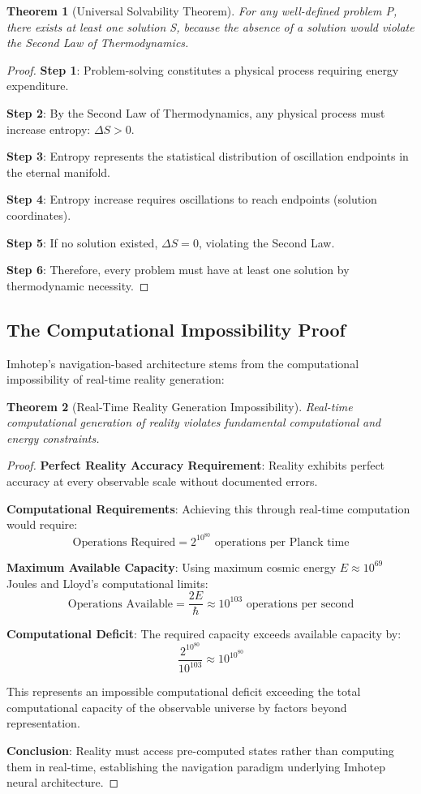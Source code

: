\documentclass[12pt,a4paper]{article}
\newtheorem{theorem}{Theorem}[section]
\theoremstyle{remark}
\begin{document}
\begin{theorem}[Universal Solvability Theorem]
For any well-defined problem P, there exists at least one solution S, because the absence of a solution would violate the Second Law of Thermodynamics.
\end{theorem}

\begin{proof}
\textbf{Step 1}: Problem-solving constitutes a physical process requiring energy expenditure.

\textbf{Step 2}: By the Second Law of Thermodynamics, any physical process must increase entropy: $\Delta S > 0$.

\textbf{Step 3}: Entropy represents the statistical distribution of oscillation endpoints in the eternal manifold.

\textbf{Step 4}: Entropy increase requires oscillations to reach endpoints (solution coordinates).

\textbf{Step 5}: If no solution existed, $\Delta S = 0$, violating the Second Law.

\textbf{Step 6}: Therefore, every problem must have at least one solution by thermodynamic necessity.
\end{proof}

\subsection{The Computational Impossibility Proof}

Imhotep's navigation-based architecture stems from the computational impossibility of real-time reality generation:

\begin{theorem}[Real-Time Reality Generation Impossibility]
Real-time computational generation of reality violates fundamental computational and energy constraints.
\end{theorem}

\begin{proof}
\textbf{Perfect Reality Accuracy Requirement}: Reality exhibits perfect accuracy at every observable scale without documented errors.

\textbf{Computational Requirements}: Achieving this through real-time computation would require:
$$\text{Operations Required} = 2^{10^{80}} \text{ operations per Planck time}$$

\textbf{Maximum Available Capacity}: Using maximum cosmic energy $E \approx 10^{69}$ Joules and Lloyd's computational limits:
$$\text{Operations Available} = \frac{2E}{\hbar} \approx 10^{103} \text{ operations per second}$$

\textbf{Computational Deficit}: The required capacity exceeds available capacity by:
$$\frac{2^{10^{80}}}{10^{103}} \approx 10^{10^{80}}$$

This represents an impossible computational deficit exceeding the total computational capacity of the observable universe by factors beyond representation.

\textbf{Conclusion}: Reality must access pre-computed states rather than computing them in real-time, establishing the navigation paradigm underlying Imhotep neural architecture.
\end{proof}
\end{document}
